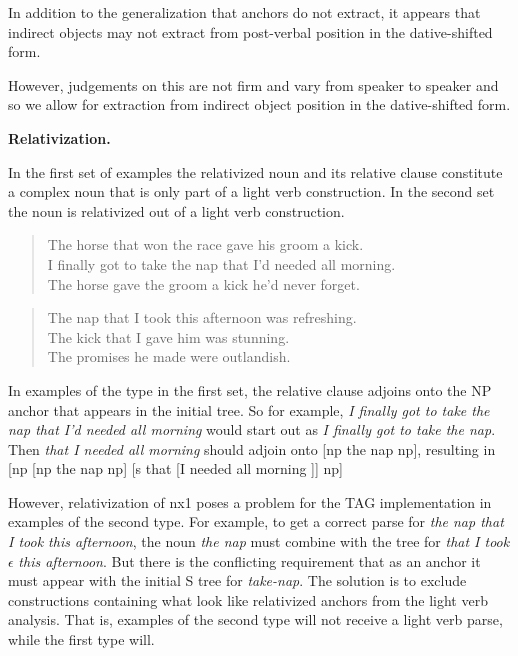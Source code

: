 In addition to the generalization that anchors do not extract, it appears
that indirect objects may not extract from post-verbal position in the
dative-shifted form.


However, judgements on this are not firm and vary from speaker to speaker
and so we allow for extraction from indirect object position in the
dative-shifted form.

\vspace{0.5in} \noindent
{\bf Relativization.} \vspace{0.25in}

In the first set of examples the relativized noun and its relative clause
constitute a complex noun that is only part of a light verb construction.
In the second set the noun is relativized out of a light verb construction.
\begin{verse}
{The horse that won the race gave his groom a kick.} \\
{I finally got to take the nap that I'd needed all morning.} \\
{The horse gave the groom a kick he'd never forget.}
\end{verse}

\begin{verse} 
{The nap that I took this afternoon was refreshing.} \\
{The kick that I gave him was stunning.} \\
{The promises he made were outlandish.}
\end{verse}
In examples of the type in the first set, the relative clause adjoins onto
the NP anchor that appears in the initial tree.  So for example, {\it I
finally got to take the nap that I'd needed all morning} would start out
as {\it I finally got to take the nap}.  Then {\it that I needed all
morning} should adjoin onto [np the nap np], resulting in [np [np the nap
np] [s that [I needed all morning ]] np]

However, relativization of nx1 poses a problem for the TAG implementation
in examples of the second type.  For example, to get a correct parse for
{\it the nap that I took this afternoon}, the noun {\it the nap} must
combine with the tree for {\it that I took} $\epsilon$ {\it this
afternoon}.  But there is the conflicting requirement that as an anchor it
must appear with the initial S tree for {\it take-nap}.  The solution is to
exclude constructions containing what look like relativized anchors from
the light verb analysis.  That is, examples of the second type will not
receive a light verb parse, while the first type will.

